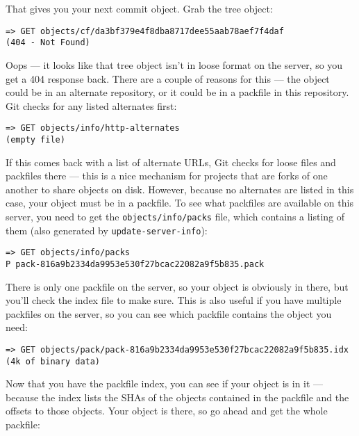 \documentclass[a4paper]{book}
\begin{document}
That gives you your next commit object. Grab the tree object:

\begin{shaded}\begin{verbatim}
=> GET objects/cf/da3bf379e4f8dba8717dee55aab78aef7f4daf
(404 - Not Found)
\end{verbatim}\end{shaded}

Oops --- it looks like that tree object isn't in loose format on the server, so you get a 404 response back. There are a couple of reasons for this --- the object could be in an alternate repository, or it could be in a packfile in this repository. Git checks for any listed alternates first:

\begin{shaded}\begin{verbatim}
=> GET objects/info/http-alternates
(empty file)
\end{verbatim}\end{shaded}

If this comes back with a list of alternate URLs, Git checks for loose files and packfiles there --- this is a nice mechanism for projects that are forks of one another to share objects on disk. However, because no alternates are listed in this case, your object must be in a packfile. To see what packfiles are available on this server, you need to get the \texttt{objects/info/packs} file, which contains a listing of them (also generated by \texttt{update-server-info}):

\begin{shaded}\begin{verbatim}
=> GET objects/info/packs
P pack-816a9b2334da9953e530f27bcac22082a9f5b835.pack
\end{verbatim}\end{shaded}

There is only one packfile on the server, so your object is obviously in there, but you'll check the index file to make sure. This is also useful if you have multiple packfiles on the server, so you can see which packfile contains the object you need:

\begin{shaded}\begin{verbatim}
=> GET objects/pack/pack-816a9b2334da9953e530f27bcac22082a9f5b835.idx
(4k of binary data)
\end{verbatim}\end{shaded}

Now that you have the packfile index, you can see if your object is in it --- because the index lists the SHAs of the objects contained in the packfile and the offsets to those objects. Your object is there, so go ahead and get the whole packfile:
\end{document}
